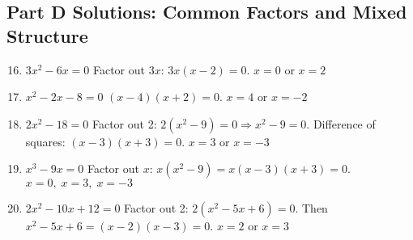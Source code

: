 \documentclass[12pt]{article}
\begin{document}
\subsection*{Part D Solutions: Common Factors and Mixed Structure}
\begin{enumerate}
  \setcounter{enumi}{15}
  \item \(3x^2 - 6x = 0\)  
  Factor out \(3x\): \(3x(x - 2) = 0.\)  
  \(\boxed{x = 0 \text{ or } x = 2}\)

  \item \(x^2 - 2x - 8 = 0\)  
  \((x - 4)(x + 2) = 0.\)  
  \(\boxed{x = 4 \text{ or } x = -2}\)

  \item \(2x^2 - 18 = 0\)  
  Factor out 2: \(2(x^2 - 9) = 0 \Rightarrow x^2 - 9 = 0.\)  
  Difference of squares: \((x - 3)(x + 3) = 0.\)  
  \(\boxed{x = 3 \text{ or } x = -3}\)

  \item \(x^3 - 9x = 0\)  
  Factor out \(x\):  
  \(x(x^2 - 9) = x(x - 3)(x + 3) = 0.\)  
  \(\boxed{x = 0,\; x = 3,\; x = -3}\)

  \item \(2x^2 - 10x + 12 = 0\)  
  Factor out 2: \(2(x^2 - 5x + 6) = 0.\)  
  Then \(x^2 - 5x + 6 = (x - 2)(x - 3) = 0.\)  
  \(\boxed{x = 2 \text{ or } x = 3}\)
\end{enumerate}
\end{document}
